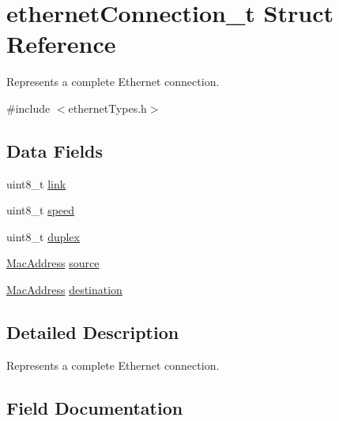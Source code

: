 \hypertarget{structethernet_connection__t}{}\section{ethernet\+Connection\+\_\+t Struct Reference}
\label{structethernet_connection__t}


Represents a complete Ethernet connection.  




{\ttfamily \#include $<$ethernet\+Types.\+h$>$}

\subsection*{Data Fields}
\begin{DoxyCompactItemize}
\item 
uint8\+\_\+t \mbox{\hyperlink{structethernet_connection__t_a1c7dfe6bdcd6993494b6e94993ef5607}{link}}
\item 
uint8\+\_\+t \mbox{\hyperlink{structethernet_connection__t_aae32029df16a54aa86c0aec2df9f7bb7}{speed}}
\item 
uint8\+\_\+t \mbox{\hyperlink{structethernet_connection__t_a9296ce83c568e13e59d7c33283886601}{duplex}}
\item 
\mbox{\hyperlink{ethernet_types_8h_ae4e06476597d217d540a5e2b2d699649}{Mac\+Address}} \mbox{\hyperlink{structethernet_connection__t_ad921b9c440e49b18b551c1c6bda03dcc}{source}}
\item 
\mbox{\hyperlink{ethernet_types_8h_ae4e06476597d217d540a5e2b2d699649}{Mac\+Address}} \mbox{\hyperlink{structethernet_connection__t_a55c89de46e499edcb53dcccd41f5618a}{destination}}
\end{DoxyCompactItemize}


\subsection{Detailed Description}
Represents a complete Ethernet connection. 

\subsection{Field Documentation}
\mbox{\label{structethernet_connection__t_a55c89de46e499edcb53dcccd41f5618a}} 
